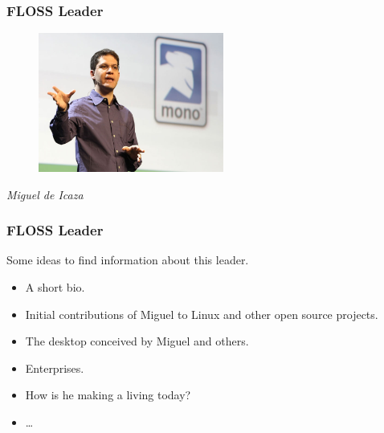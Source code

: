 \documentclass{beamer}
\begin{document}
\begin{frame}
\frametitle{FLOSS Leader}

\begin{figure}[h]
\begin{center}
  \includegraphics[height=1.80in]{figs/miguel_de_icaza.jpg}
\end{center}
\end{figure}

\pause

\begin{center}
{\it Miguel de Icaza}
\end{center}

\end{frame}

\begin{frame}
\frametitle{FLOSS Leader}

Some ideas to find information about this leader.
\pause
\begin{itemize}
\item A short bio.
\item Initial contributions of Miguel to Linux and other open source projects.
\item The desktop conceived by Miguel and others.
\item Enterprises.
\item How is he making a living today?
\item \ldots
\end{itemize}

\end{frame}
\end{document}
